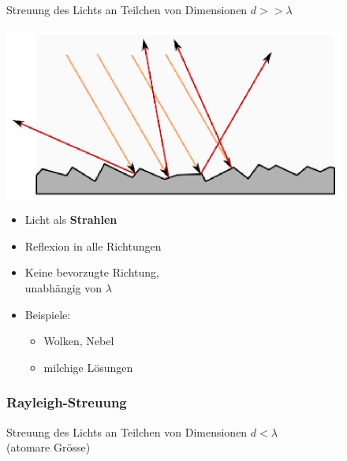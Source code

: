Streuung des Lichts an Teilchen von Dimensionen $d >> \lambda$ \\ 

\begin{minipage}{0.45\linewidth}
\includegraphics[width=\linewidth]{Bilder/Wellen-Optik/diffuse_streuung}
\end{minipage}
\hfill
\begin{minipage}{0.53\linewidth}

\begin{itemize}
\item Licht als \textbf{Strahlen}
\item Reflexion in alle Richtungen
\item Keine bevorzugte Richtung, \\
	  unabhängig von $\lambda$ 
\item Beispiele:
	\begin{itemize}
		\item Wolken, Nebel 
		\item milchige Lösungen
	\end{itemize}	  
\end{itemize}

\end{minipage}




\subsubsection{Rayleigh-Streuung}

Streuung des Lichts an Teilchen von Dimensionen $d < \lambda$ \\
(atomare Grösse) \\ 

